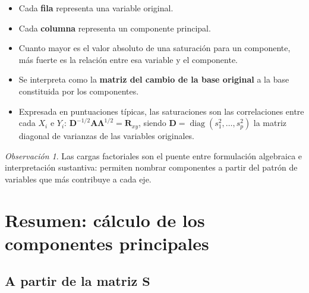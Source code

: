 \documentclass[12pt, a4paper]{article}
\theoremstyle{plain}
\theoremstyle{definition}
\theoremstyle{remark}
\newtheorem*{observacion}{Observación}
\newcommand{\mat}[1]{\mathbf{#1}}
\newcommand{\diag}{\operatorname{diag}}
\begin{document}
\begin{itemize}
  \item Cada \textbf{fila} representa una variable original.
  \item Cada \textbf{columna} representa un componente principal.
  \item Cuanto mayor es el valor absoluto de una saturación para un
        componente, más fuerte es la relación entre esa variable y el
        componente.
  \item Se interpreta como la \textbf{matriz del cambio de la base original}
        a la base constituida por los componentes.
  \item Expresada en puntuaciones típicas, las saturaciones son las
        correlaciones entre cada $X_i$ e $Y_i$:
        $\mat{D}^{-1/2}\mat{A}\boldsymbol{\Lambda}^{1/2} = \mat{R}_{xy}$,
        siendo $\mat{D}=\diag(s_1^2,\dots,s_p^2)$ la matriz diagonal de
        varianzas de las variables originales.
\end{itemize}

\begin{observacion}
Las cargas factoriales son el puente entre formulación algebraica e
interpretación sustantiva: permiten nombrar componentes a partir del patrón de
variables que más contribuye a cada eje.
\end{observacion}

\section{Resumen: cálculo de los componentes principales}

\subsection*{A partir de la matriz $\mat{S}$}
\end{document}

